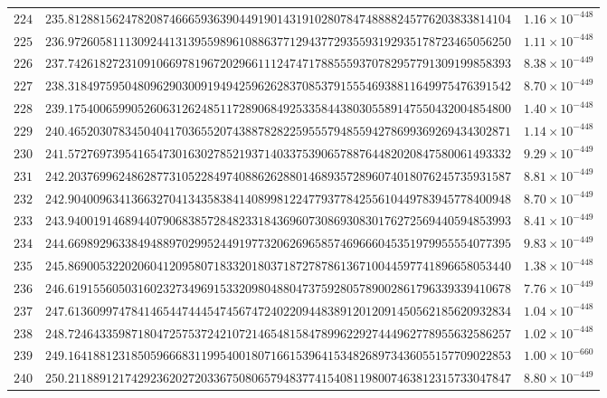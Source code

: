 \documentclass[12pt,reqno]{amsart}
\theoremstyle{remark}
\begin{document}
\begin{longtable}{clc}
$224$ & $235.8128815624782087466659363904491901431910280784748888245776203833814104$ & $1.16\times 10^{-448}$ \\
$225$ & $236.9726058111309244131395598961088637712943772935593192935178723465056250$ & $1.11\times 10^{-448}$ \\
$226$ & $237.7426182723109106697819672029661112474717885559370782957791309199858393$ & $8.38\times 10^{-449}$ \\
$227$ & $238.3184975950480962903009194942596262837085379155546938811649975476391542$ & $8.70\times 10^{-449}$ \\
$228$ & $239.1754006599052606312624851172890684925335844380305589147550432004854800$ & $1.40\times 10^{-448}$ \\
$229$ & $240.4652030783450404170365520743887828225955579485594278699369269434302871$ & $1.14\times 10^{-448}$ \\
$230$ & $241.5727697395416547301630278521937140337539065788764482020847580061493332$ & $9.29\times 10^{-449}$ \\
$231$ & $242.2037699624862877310522849740886262880146893572896074018076245735931587$ & $8.81\times 10^{-449}$ \\
$232$ & $242.9040096341366327041343583841408998122477937784255610449783945778400948$ & $8.70\times 10^{-449}$ \\
$233$ & $243.9400191468944079068385728482331843696073086930830176272569440594853993$ & $8.41\times 10^{-449}$ \\
$234$ & $244.6698929633849488970299524491977320626965857469666045351979955554077395$ & $9.83\times 10^{-449}$ \\
$235$ & $245.8690053220206041209580718332018037187278786136710044597741896658053440$ & $1.38\times 10^{-448}$ \\
$236$ & $246.6191556050316023273496915332098048804737592805789002861796339339410678$ & $7.76\times 10^{-449}$ \\
$237$ & $247.6136099747841465447444547456747240220944838912012091450562185620932834$ & $1.04\times 10^{-448}$ \\
$238$ & $248.7246433598718047257537242107214654815847899622927444962778955632586257$ & $1.02\times 10^{-448}$ \\
$239$ & $249.1641881231850596668311995400180716615396415348268973436055157709022853$ & $1.00\times 10^{-660}$ \\
$240$ & $250.2118891217429236202720336750806579483774154081198007463812315733047847$ & $8.80\times 10^{-449}$ \\

\end{longtable}
\end{document}

